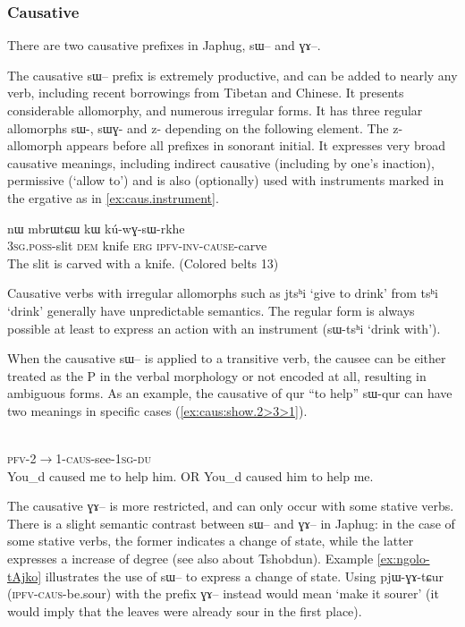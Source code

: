 \documentclass[oldfontcommands,oneside,a4paper,11pt]{article}
\newcommand{\ipa}[1]{{\phon #1}} %
\begin{document}
\citet{jacques12incorp}

\subsubsection{Causative}
There are two causative prefixes in Japhug, \ipa{sɯ--} and \ipa{ɣɤ--}. 

The causative   \ipa{sɯ--} prefix is extremely productive, and can be added to nearly any verb, including recent borrowings from Tibetan and Chinese. It presents  considerable allomorphy, and numerous irregular forms. It has three regular allomorphs \ipa{sɯ-}, \ipa{sɯɣ-} and \ipa{z-} depending on the following element. The \ipa{z-} allomorph appears before all prefixes in sonorant initial. It expresses very broad causative meanings, including indirect causative (including by one's inaction), permissive (`allow to') and is also (optionally) used with  instruments marked in the ergative as in \ref{ex:caus.instrument}.


\begin{exe}
\ex \label{ex:caus.instrument}
\gll  \ipa{ɯ-χto} 	\ipa{nɯ} 	\ipa{mbrɯtɕɯ} 	\ipa{kɯ} 	\ipa{kú-wɣ-sɯ-rkhe}  \\
\textsc{3sg.poss}-slit \textsc{dem} knife \textsc{erg}  \textsc{ipfv-inv-cause}-carve \\
 \glt  The slit is carved with a knife. (Colored belts 13)
\end{exe} 

Causative verbs with irregular allomorphs such as \ipa{jtsʰi} `give to drink'  from \ipa{tsʰi} `drink' generally have unpredictable semantics. The regular form is always possible at least to express an action with an instrument (\ipa{sɯ-tsʰi} `drink with').

When the causative \ipa{sɯ--} is applied to a transitive verb, the causee can be either treated as the P in the verbal morphology or not encoded at all, resulting in ambiguous forms. As an example, the causative of \ipa{qur} ``to help''  \ipa{sɯ-qur} can have two meanings in specific cases (\ref{ex:caus:show.2>3>1}).

\begin{exe} 
\ex \label{ex:caus:show.2>3>1}
\gll   \ipa{tɤ-kɯ-sɯ-qur-a-ndʑi}  \\
 \textsc{pfv-2$\rightarrow$1-caus}-see-\textsc{1sg-du}  \\
 \glt  You_d caused me to help him. OR You_d caused him to help me. 
\end{exe} 

The causative \ipa{ɣɤ--} is more restricted, and can only occur with some stative verbs. There is a slight semantic contrast between \ipa{sɯ--} and \ipa{ɣɤ--} in Japhug: in the case of some stative verbs, the former indicates a change of state, while the latter expresses a increase of degree (see also \citealt{jackson06paisheng} about Tshobdun). Example \ref{ex:ngolo-tAjko}  illustrates the use of \ipa{sɯ--} to express a change of state. Using \ipa{pjɯ-ɣɤ-tɕur} (\textsc{ipfv-caus}-be.sour) with the prefix \ipa{ɣɤ--} instead would mean `make it sourer' (it would imply that the leaves were already sour in the first place).
\end{document}
